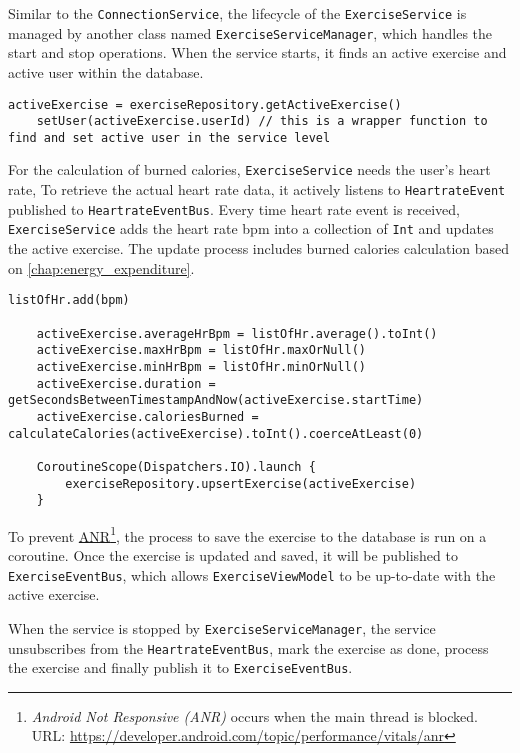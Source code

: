 Similar to the \verb;ConnectionService;, the lifecycle of the \verb;ExerciseService; is managed by another class named \verb;ExerciseServiceManager;, which handles the start and stop operations. 
When the service starts, it finds an active exercise and active user within the database. 
\begin{lstlisting}[caption={On service started (ExerciseService)}]
    activeExercise = exerciseRepository.getActiveExercise()
    setUser(activeExercise.userId) // this is a wrapper function to find and set active user in the service level
\end{lstlisting}

For the calculation of burned calories, \verb;ExerciseService; needs the user's heart rate, To retrieve the actual heart rate data, it actively listens to \verb;HeartrateEvent; published to \verb;HeartrateEventBus;.
Every time heart rate event is received, \verb;ExerciseService; adds the heart rate bpm into a collection of \verb;Int; and updates the active exercise. The update process includes burned calories calculation based on \autoref{chap:energy_expenditure}. 
\begin{lstlisting}[caption={Process active exercise (ExerciseService)}]
    listOfHr.add(bpm)

    activeExercise.averageHrBpm = listOfHr.average().toInt()
    activeExercise.maxHrBpm = listOfHr.maxOrNull()
    activeExercise.minHrBpm = listOfHr.minOrNull()
    activeExercise.duration = getSecondsBetweenTimestampAndNow(activeExercise.startTime)
    activeExercise.caloriesBurned = calculateCalories(activeExercise).toInt().coerceAtLeast(0)

    CoroutineScope(Dispatchers.IO).launch {
        exerciseRepository.upsertExercise(activeExercise)
    }
\end{lstlisting}

To prevent \url{ANR}\footnote{\emph{Android Not Responsive (ANR)} occurs when the main thread is blocked. URL: \url{https://developer.android.com/topic/performance/vitals/anr}}, the process to save the exercise to the database is run on a coroutine.
Once the exercise is updated and saved, it will be published to \verb;ExerciseEventBus;, which allows \verb;ExerciseViewModel; to be up-to-date with the active exercise.

When the service is stopped by \verb;ExerciseServiceManager;, the service unsubscribes from the \verb;HeartrateEventBus;, mark the exercise as done, process the exercise and finally publish it to \verb;ExerciseEventBus;.